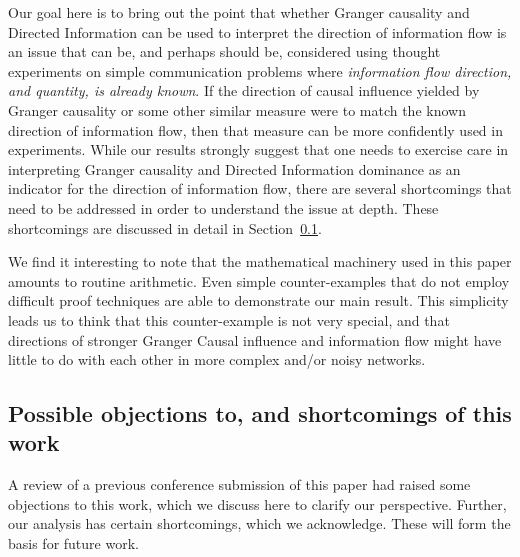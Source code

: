\documentclass[letterpaper, 10pt, conference]{ieeeconf}
\begin{document}
Our goal here is to bring out the point that whether Granger causality and Directed Information can be used to interpret the direction of information flow is an issue that can be, and perhaps should be, considered using thought experiments on simple communication problems where \emph{information flow direction, and quantity, is already known}. If the direction of causal influence yielded by Granger causality or some other similar measure were to match the known direction of information flow, then that measure can be more confidently used in experiments. While our results strongly suggest that one needs to exercise care in interpreting Granger causality and Directed Information dominance as an indicator for the direction of information flow, there are several shortcomings that need to be addressed in order to understand the issue at depth. These shortcomings are discussed in detail in Section~\ref{sec:objections-and-shortcomings}.

We find it interesting to note that the mathematical machinery used in this paper amounts to routine arithmetic. Even simple counter-examples that do not employ difficult proof techniques are able to demonstrate our main result. This simplicity leads us to think that this counter-example is not very special, and that directions of stronger Granger Causal influence and information flow might have little to do with each other in more complex and/or noisy networks.


\subsection{Possible objections to, and shortcomings of this work}
\label{sec:objections-and-shortcomings}

A review of a previous conference submission of this paper had raised some objections to this work, which we discuss here to clarify our perspective. Further, our analysis has certain shortcomings, which we acknowledge. These will form the basis for future work.
\end{document}
